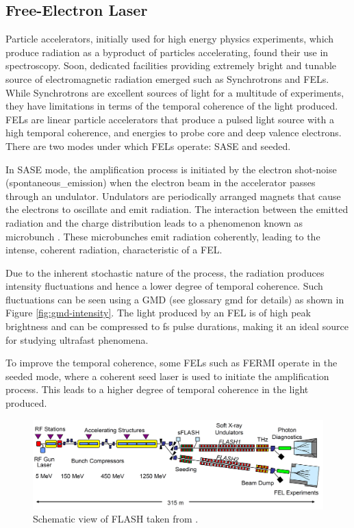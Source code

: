 \subsection*{Free-Electron Laser}
Particle accelerators, initially used for high energy physics experiments, which produce radiation as a byproduct of particles accelerating, found their use in spectroscopy. Soon, dedicated facilities providing extremely bright and tunable source of electromagnetic radiation emerged such as Synchrotrons and \glspl{FEL}.
While Synchrotrons are excellent sources of light for a multitude of experiments, they have limitations in terms of the temporal coherence of the light produced. \Glspl{FEL} are linear particle accelerators that produce a pulsed light source with a high temporal coherence, and energies to probe core and deep valence electrons. There are two modes under which \glspl{FEL} operate: \gls{SASE} and seeded.


In \gls{SASE} mode, the amplification process is initiated by the electron shot-noise (\gls{spontaneous_emission}) when the electron beam in the accelerator passes through an undulator. Undulators are periodically arranged magnets that cause the electrons to oscillate and emit radiation. The interaction between the emitted radiation and the charge distribution leads to a phenomenon known as \gls{microbunch} \cite{ackermannOperationFreeelectronLaser2007}. These microbunches emit radiation coherently, leading to the intense, coherent radiation, characteristic of a \gls{FEL}. 

Due to the inherent stochastic nature of the process, the radiation produces intensity fluctuations and hence a lower degree of temporal coherence. Such fluctuations can be seen using a \gls{GMD} (see glossary \gls{gmd} for details) as shown in Figure \ref{fig:gmd-intensity}. The light produced by an \gls{FEL} is of high peak brightness and can be compressed to \unit{fs} pulse durations, making it an ideal source for studying ultrafast phenomena.

To improve the temporal coherence, some \glspl{FEL} such as FERMI \cite{svandrlikDevelopmentPerspectivesFERMI2017} operate in the seeded mode, where a coherent seed laser is used to initiate the amplification process. This leads to a higher degree of temporal coherence in the light produced.

\begin{figure}
    \includegraphics[width=1\linewidth]{images/flash_fel.png}
    \caption{Schematic view of \gls{FLASH} taken from \cite{faatzSimultaneousOperationTwo2016}.}
    \label{fig:flash-schematic}
\end{figure}


